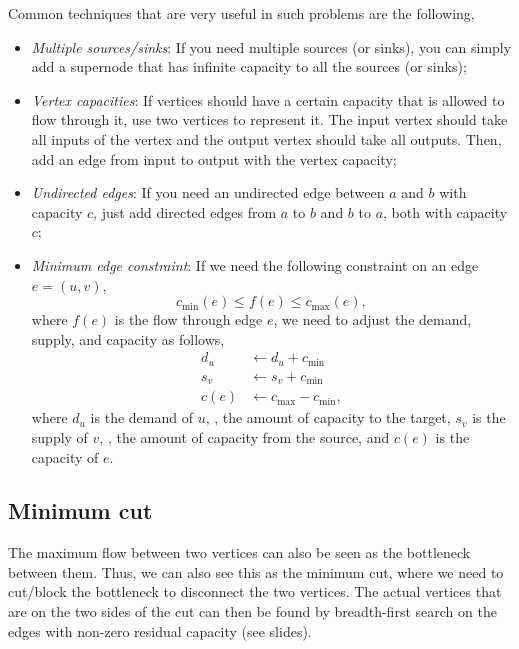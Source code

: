 \documentclass[justified,nobib]{tufte-handout}
\begin{document}
Common techniques that are very useful in such problems are the following,
\begin{itemize}
    \item \textit{Multiple sources/sinks}: If you need multiple sources (or
          sinks), you can simply add a supernode that has infinite capacity to all
          the sources (or sinks);
    \item \textit{Vertex capacities}: If vertices should have a certain capacity
          that is allowed to flow through it, use two vertices to represent it. The
          input vertex should take all inputs of the vertex and the output vertex
          should take all outputs. Then, add an edge from input to output with the
          vertex capacity;
    \item \textit{Undirected edges}: If you need an undirected edge between $a$
          and $b$ with capacity $c$, just add directed edges from $a$ to $b$ and $b$
          to $a$, both with capacity $c$;
    \item \textit{Minimum edge constraint}: If we need the following constraint
          on an edge $e=(u,v)$, \[
              c_{\min}(e) \leq f(e) \leq c_{\max}(e),
          \]
          where $f(e)$ is the flow through edge $e$, we need to adjust the demand,
          supply, and capacity as follows,
          \begin{align*}
              d_u  & \gets d_u + c_{\min}       \\
              s_v  & \gets s_v + c_{\min}       \\
              c(e) & \gets c_{\max} - c_{\min},
          \end{align*}
          where $d_u$ is the demand of $u$, \ie, the amount of capacity to the
          target, $s_v$ is the supply of $v$, \ie, the amount of capacity from the
          source, and $c(e)$ is the capacity of $e$.
\end{itemize}

\subsection{Minimum cut}

The maximum flow between two vertices can also be seen as the bottleneck
between them. Thus, we can also see this as the minimum cut, where we need to
cut/block the bottleneck to disconnect the two vertices. The actual vertices
that are on the two sides of the cut can then be found by breadth-first search
on the edges with non-zero residual capacity (see slides).
\end{document}
